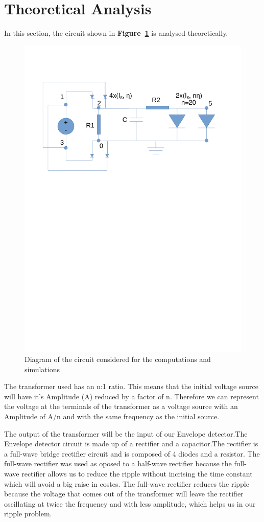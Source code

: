 \section{Theoretical Analysis}
\label{sec:analysis}

In this section, the circuit shown in \textbf{Figure~\ref{fig:diagram_t3}} is analysed
theoretically.
\begin{figure}[H] \centering
\includegraphics[width=0.6\linewidth]{diagram_t3.pdf}
\vspace{-6cm}
\caption{Diagram of the circuit considered for the computations and simulations}
\label{fig:diagram_t3}
\end{figure}

The transformer used has an n:1 ratio. This means that the initial voltage source will have it's Amplitude (A) reduced by a factor of n. Therefore we can represent the voltage at the terminals of the transformer as a voltage source with an Amplitude of A/n and with the same frequency as the initial source. 

The output of the transformer will be the input of our Envelope detector.The Envelope detector circuit is made up of a rectifier and a capacitor.The rectifier is a full-wave bridge rectifier circuit and is composed of 4 diodes and a resistor. The full-wave rectifier was used as oposed to a half-wave rectifier because the full-wave rectifier allows us to reduce the ripple without incrising the time constant which will avoid a big raise in costes. The full-wave rectifier reduces the ripple because the voltage that comes out of the transformer will leave the rectifier oscillating at twice the frequency and with less amplitude, which helps us in our ripple problem.

